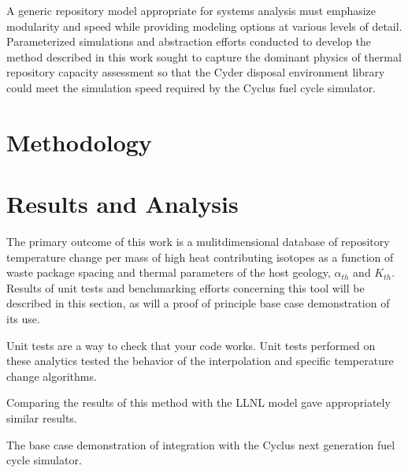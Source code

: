 \documentclass{anstrans}
\begin{document}
A generic repository model appropriate for systems analysis must emphasize 
modularity and speed while providing modeling options at various levels of 
detail. Parameterized simulations and abstraction efforts conducted to develop 
the method described in this work sought to capture the dominant physics of 
thermal repository capacity assessment so that the Cyder disposal environment 
library could meet the simulation speed required by the Cyclus fuel cycle 
simulator.

\section{Methodology}







\section{Results and Analysis}

The primary outcome of this work is a mulitdimensional database of repository temperature 
change per mass of high heat contributing isotopes as a function of waste
package spacing and thermal parameters of the host geology, $\alpha_{th}$ and $K_{th}$. 
Results of unit tests and benchmarking efforts concerning this tool will be described in this 
section, as will a proof of principle base case demonstration of its use. 


Unit tests are a way to check that your code works. Unit tests performed on 
these analytics tested the behavior of the interpolation and specific 
temperature change algorithms.


Comparing the results of this method with the \gls{LLNL} model gave 
appropriately similar results. 


The base case demonstration of integration with the Cyclus next generation 
fuel cycle simulator.
\end{document}
